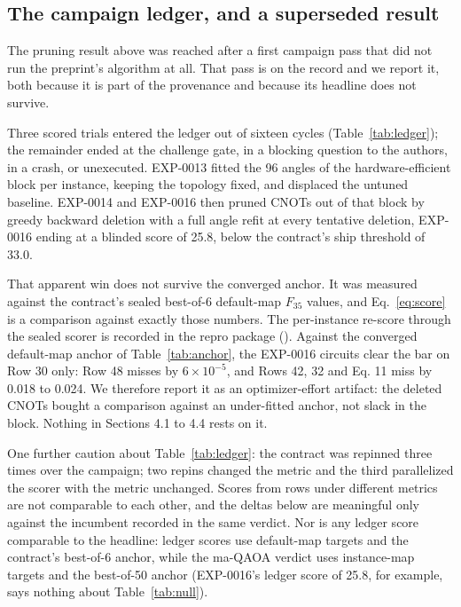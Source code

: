 \documentclass[11pt]{article}
\begin{document}
\subsection{The campaign ledger, and a superseded result}

The pruning result above was reached after a first campaign pass that did not run the preprint's algorithm at all. That pass is on the record and we report it, both because it is part of the provenance and because its headline does not survive.

Three scored trials entered the ledger out of sixteen cycles (Table~\ref{tab:ledger}); the remainder ended at the challenge gate, in a blocking question to the authors, in a crash, or unexecuted. EXP-0013 fitted the 96 angles of the hardware-efficient block per instance, keeping the topology fixed, and displaced the untuned baseline. EXP-0014 and EXP-0016 then pruned CNOTs out of that block by greedy backward deletion with a full angle refit at every tentative deletion, EXP-0016 ending at a blinded score of 25.8, below the contract's ship threshold of 33.0.

That apparent win does not survive the converged anchor. It was measured against the contract's sealed best-of-6 default-map $F_{35}$ values, and Eq.~\ref{eq:score} is a comparison against exactly those numbers. The per-instance re-score through the sealed scorer is recorded in the repro package (). Against the converged default-map anchor of Table~\ref{tab:anchor}, the EXP-0016 circuits clear the bar on Row 30 only: Row 48 misses by $6\times 10^{-5}$, and Rows 42, 32 and Eq. 11 miss by 0.018 to 0.024. We therefore report it as an optimizer-effort artifact: the deleted CNOTs bought a comparison against an under-fitted anchor, not slack in the block. Nothing in Sections 4.1 to 4.4 rests on it.

One further caution about Table~\ref{tab:ledger}: the contract was repinned three times over the campaign; two repins changed the metric and the third parallelized the scorer with the metric unchanged. Scores from rows under different metrics are not comparable to each other, and the deltas below are meaningful only against the incumbent recorded in the same verdict. Nor is any ledger score comparable to the headline: ledger scores use default-map targets and the contract's best-of-6 anchor, while the ma-QAOA verdict uses instance-map targets and the best-of-50 anchor (EXP-0016's ledger score of 25.8, for example, says nothing about Table~\ref{tab:null}).
\end{document}
